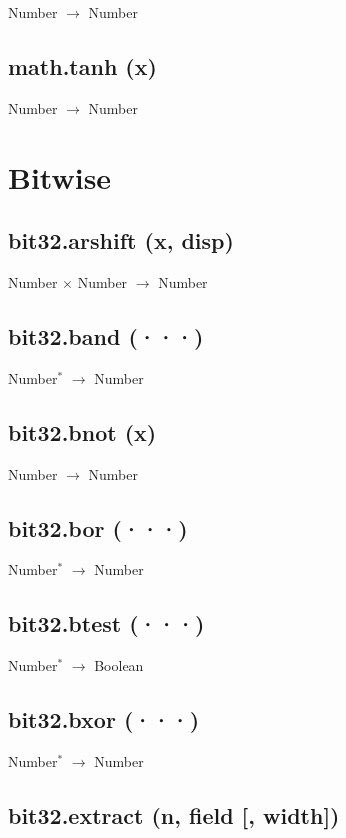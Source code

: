 \documentclass[12pt]{article}
\begin{document}
Number $\rightarrow$ Number

\subsection{math.tanh (x)}

Number $\rightarrow$ Number

\newpage

\section{Bitwise}

\subsection{bit32.arshift (x, disp)}

Number $\times$ Number $\rightarrow$ Number

\subsection{bit32.band (···)}

Number$^*$ $\rightarrow$ Number

\subsection{bit32.bnot (x)}

Number $\rightarrow$ Number

\subsection{bit32.bor (···)}

Number$^*$ $\rightarrow$ Number

\subsection{bit32.btest (···)}

Number$^*$ $\rightarrow$ Boolean

\subsection{bit32.bxor (···)}

Number$^*$ $\rightarrow$ Number

\subsection{bit32.extract (n, field [, width])}
\end{document}
